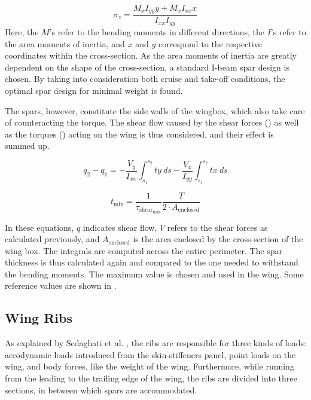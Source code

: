 \begin{equation}
    \sigma_z = \frac{M_xI_{yy}y + M_xI_{xx}x}{I_{xx}I_{yy}}
    \label{eq:normalstress}
\end{equation}
Here, the $M$'s refer to the bending moments in different directions, the $I$'s refer to the area moments of inertia, and $x$ and $y$ correspond to the respective coordinates within the cross-section.
As the area moments of inertia are greatly dependent on the shape of the cross-section, a standard I-beam spar design is chosen.
By taking into consideration both cruise and take-off conditions, the optimal spar design for minimal weight is found.

The spars, however, constitute the side walls of the wingbox, which also take care of counteracting the torque.
The shear flow caused by the shear forces () as well as the torques () acting on the wing is thus considered, and their effect is summed up.


\begin{equation}
    q_2 - q_1 = -\frac{V_y}{I_{xx}}\int_{s_1}^{s_2}ty \ ds -\frac{V_x}{I_{yy}}\int_{s_1}^{s_2}tx \ ds
    \label{eq:shear}
\end{equation}


\begin{equation}
     t_{\min} = \frac{1}{\tau_{\text{shear}_{\max}}} \frac{T}{2 \cdot A_\text{enclosed}}
    \label{eq:torque}
\end{equation}


In these equations, $q$ indicates shear flow, $V$ refers to the shear forces as calculated previously, and $A_\text{enclosed}$ is the area enclosed by the cross-section of the wing box.
The integrals are computed across the entire perimeter.
The spar thickness is thus calculated again and compared to the one needed to withstand the bending moments.
The maximum value is chosen and used in the wing.
Some reference values are shown in .


\subsection{Wing Ribs}
\label{sec:wingribs}
As explained by Sedaghati et al. \cite{sedaghati2006wing}, the ribs are responsible for three kinds of loads:
aerodynamic loads introduced from the skin-stiffeners panel,
point loads on the wing, and body forces, like the weight of the wing.
Furthermore, while running from the leading to the trailing edge of the wing, the ribs are divided into three sections, in between which spars are accommodated.

